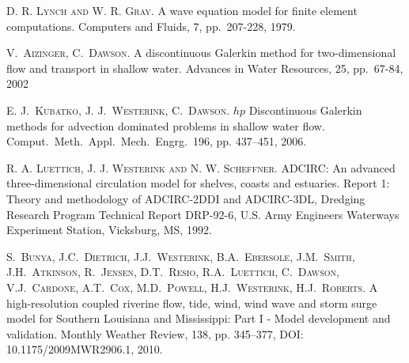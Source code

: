 
\begin{thebibliography}{10}
\textsc{D. R. Lynch and W. R. Gray}. {A wave equation model for finite element computations}. Computers and Fluids, 7, pp.\ 207-228, 1979.  

\textsc{V.~Aizinger, C.~Dawson}. {A discontinuous Galerkin method for two-dimensional flow and transport in shallow water}. Advances in Water Resources, 25, pp.\ 67-84, 2002

\textsc{E. J.~Kubatko, J. J.~Westerink, C.~Dawson}. {$hp$ Discontinuous Galerkin methods for advection dominated problems in shallow water flow}. Comput.~Meth.~Appl.~Mech.~Engrg.~196, pp. 437--451, 2006.

\textsc{R. A. Luettich, J. J. Westerink and N. W. Scheffner}. {ADCIRC: An advanced three-dimensional circulation model for shelves, coasts and estuaries}. Report 1: Theory and methodology of ADCIRC-2DDI and ADCIRC-3DL, Dredging Research Program Technical Report DRP-92-6, U.S. Army Engineers Waterways Experiment Station, Vicksburg, MS, 1992.

\textsc{S.~Bunya, J.C.~Dietrich, J.J.~Westerink, B.A.~Ebersole, J.M.~Smith,  J.H.~Atkinson, R.~Jensen, D.T.~Resio, R.A.~Luettich, C.~Dawson, V.J.~Cardone, A.T.~Cox, M.D.~Powell, H.J.~Westerink, H.J.~Roberts}. {A high-resolution coupled riverine flow, tide, wind, wind wave and storm surge model for Southern Louisiana and Mississippi: Part I - Model development and validation}. Monthly Weather Review, 138, pp. 345--377, DOI: 10.1175/2009MWR2906.1, 2010.  



\end{thebibliography}
